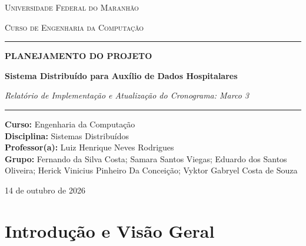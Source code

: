 \documentclass[12pt,a4paper]{article}
\begin{document}
	\begin{titlepage}
		\centering
		\vspace*{0.8cm}
		
		{\scshape\Large Universidade Federal do Maranhão \par}
		\vspace{0.3cm}
		{\scshape\large Curso de Engenharia da Computação \par}
		\vspace{1.5cm}
		
		\rule{\linewidth}{1.5pt}\vspace{0.4cm}
		{\Huge\bfseries PLANEJAMENTO DO PROJETO\par}
		\vspace{0.5cm}
		{\LARGE\bfseries Sistema Distribuído para Auxílio de Dados Hospitalares\par}
		\vspace{0.3cm}
		{\Large\itshape Relatório de Implementação e Atualização do Cronograma: Marco 3\par}
		\rule{\linewidth}{1.5pt}
		
		\vspace{1.8cm}
		
		\begin{minipage}{0.88\textwidth}
			\raggedright
			\textbf{Curso:} Engenharia da Computação \\[6pt]
			\textbf{Disciplina:} Sistemas Distribuídos \\[6pt]
			\textbf{Professor(a):} Luiz Henrique Neves Rodrigues \\[6pt]
			\textbf{Grupo:} Fernando da Silva Costa; Samara Santos Viegas; Eduardo dos Santos Oliveira; Herick Vinicius Pinheiro Da Conceição; Vyktor Gabryel Costa de Souza
		\end{minipage}
		
		\vfill
		
		{\large 14 de outubro de 2026 \par}
	\end{titlepage}
	
	\newpage
	\tableofcontents
	\newpage
	
	\section{Introdução e Visão Geral}
	
\end{document}
